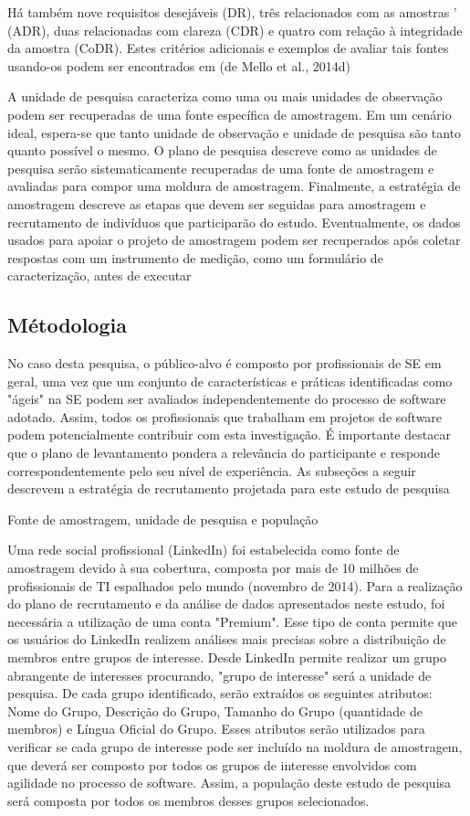 Há também nove requisitos desejáveis (DR), três relacionados com as amostras '
(ADR), duas relacionadas com clareza (CDR) e quatro com relação à integridade da
amostra (CoDR). Estes critérios adicionais e exemplos de avaliar tais fontes
usando-os podem ser encontrados em (de Mello et al., 2014d)

A unidade de pesquisa caracteriza como uma ou mais unidades de observação podem
ser recuperadas de uma fonte específica de amostragem. Em um cenário ideal,
espera-se que tanto unidade de observação e unidade de pesquisa são tanto quanto
possível o mesmo. O plano de pesquisa descreve como as unidades de pesquisa
serão sistematicamente recuperadas de uma fonte de amostragem e avaliadas para
compor uma moldura de amostragem. Finalmente, a estratégia de amostragem
descreve as etapas que devem ser seguidas para amostragem e recrutamento de
indivíduos que participarão do estudo. Eventualmente, os dados usados para
apoiar o projeto de amostragem podem ser recuperados após coletar respostas com
um instrumento de medição, como um formulário de caracterização, antes de
executar
\subsection{Métodologia}
No caso desta pesquisa, o público-alvo é composto por profissionais de SE em
geral, uma vez que um conjunto de características e práticas identificadas como
"ágeis" na SE podem ser avaliados independentemente do processo de software
adotado. Assim, todos os profissionais que trabalham em projetos de software
podem potencialmente contribuir com esta investigação. É importante destacar que
o plano de levantamento pondera a relevância do participante e responde
correspondentemente pelo seu nível de experiência. As subseções a seguir
descrevem a estratégia de recrutamento projetada para este estudo de pesquisa

Fonte de amostragem, unidade de pesquisa e população

Uma rede social profissional (LinkedIn) foi estabelecida como fonte de
amostragem devido à sua cobertura, composta por mais de 10 milhões de
profissionais de TI espalhados pelo mundo (novembro de 2014). Para a realização
do plano de recrutamento e da análise de dados apresentados neste estudo, foi
necessária a utilização de uma conta "Premium". Esse tipo de conta permite que
os usuários do LinkedIn realizem análises mais precisas sobre a distribuição de
membros entre grupos de interesse. Desde LinkedIn permite realizar um grupo
abrangente de interesses procurando, "grupo de interesse" será a unidade de
pesquisa. De cada grupo identificado, serão extraídos os seguintes atributos:
Nome do Grupo, Descrição do Grupo, Tamanho do Grupo (quantidade de membros) e
Língua Oficial do Grupo. Esses atributos serão utilizados para verificar se cada
grupo de interesse pode ser incluído na moldura de amostragem, que deverá ser
composto por todos os grupos de interesse envolvidos com agilidade no processo
de software. Assim, a população deste estudo de pesquisa será composta por todos
os membros desses grupos selecionados.

